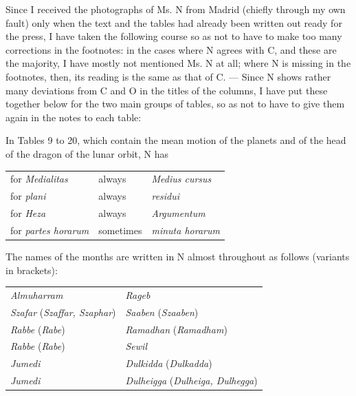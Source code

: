 \documentclass[11pt]{article}
\newcommand{\Pg}[1]{\marginpar{\footnotesize\color{gray}#1}}
\begin{document}
\par \Pg{XIV}Since I received the photographs of Ms. N from Madrid (chiefly through my own fault) only when the text and the tables had already been written out ready for the press, I have taken the following course so as not to have to make too many corrections in the footnotes: in the cases where N agrees with C, and these are the majority, I have mostly not mentioned Ms. N at all; where N is missing in the footnotes, then, its reading is the same as that of C. — Since N shows rather many deviations from C and O in the titles of the columns, I have put these together below for the two main groups of tables, so as not to have to give them again in the notes to each table:\par
\par In Tables 9 to 20, which contain the mean motion of the planets and of the head of the dragon of the lunar orbit, N has\par
\begin{center}\small\begin{tabular}{lll}
for \emph{Medialitas} & always & \emph{Medius cursus} \\
for \emph{plani} & always & \emph{residui} \\
for \emph{Heza} & always & \emph{Argumentum} \\
for \emph{partes horarum} & sometimes & \emph{minuta horarum} \\
\end{tabular}\end{center}
\par The names of the months are written in N almost throughout as follows (variants in brackets):\par
\begin{center}\small\begin{tabular}{ll}
\emph{Almuharram} & \emph{Rageb} \\
\emph{Szafar} (\emph{Szaffar, Szaphar}) & \emph{Saaben} (\emph{Szaaben}) \\
\emph{Rabbe}\footnotemark{} (\emph{Rabe}) & \emph{Ramadhan} (\emph{Ramadham}) \\
\emph{Rabbe} (\emph{Rabe}) & \emph{Sewil} \\
\emph{Jumedi} & \emph{Dulkidda} (\emph{Dulkadda}) \\
\emph{Jumedi} & \emph{Dulheigga} (\emph{Dulheiga, Dulhegga}) \\
\end{tabular}\end{center}
\addtocounter{footnote}{-1}
\end{document}
